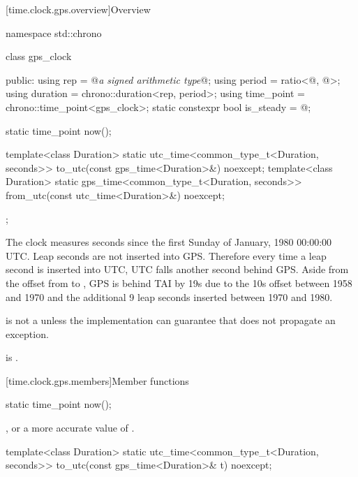 [time.clock.gps.overview]{Overview}
%

\begin{codeblock}
namespace std::chrono {
  class gps_clock {
  public:
    using rep                       = @\textit{a signed arithmetic type}@;
    using period                    = ratio<@\unspecnc@, @\unspec@>;
    using duration                  = chrono::duration<rep, period>;
    using time_point                = chrono::time_point<gps_clock>;
    static constexpr bool is_steady = @\unspec@;

    static time_point now();

    template<class Duration>
      static utc_time<common_type_t<Duration, seconds>>
        to_utc(const gps_time<Duration>&) noexcept;
    template<class Duration>
      static gps_time<common_type_t<Duration, seconds>>
        from_utc(const utc_time<Duration>&) noexcept;
  };
}
\end{codeblock}

\pnum
The clock  measures
seconds since the first Sunday of January, 1980 00:00:00 UTC\@.
Leap seconds are not inserted into GPS\@.
Therefore every time a leap second is inserted into UTC,
UTC falls another second behind GPS\@.
Aside from the offset from  to ,
GPS is behind TAI by 19s due to the 10s offset between 1958 and 1970
and the additional 9 leap seconds inserted between 1970 and 1980.

\pnum
{} is not a 
unless the implementation can guarantee that
 does not propagate an exception.
\begin{note}
 is .
\end{note}

[time.clock.gps.members]{Member functions}

%
\begin{itemdecl}
static time_point now();
\end{itemdecl}

\begin{itemdescr}
\pnum
\returns
{}, or a more accurate value of .
\end{itemdescr}

%
\begin{itemdecl}
template<class Duration>
  static utc_time<common_type_t<Duration, seconds>>
    to_utc(const gps_time<Duration>& t) noexcept;
\end{itemdecl}

